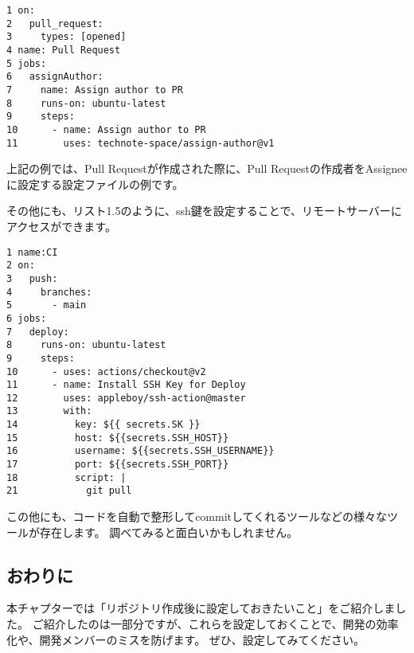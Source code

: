 \begin{tcolorbox}[title=リスト1.4 .github/workflows/pr.yml]
  \begin{verbatim}
1 on:
2   pull_request:
3     types: [opened]
4 name: Pull Request
5 jobs:
6   assignAuthor:
7     name: Assign author to PR
8     runs-on: ubuntu-latest
9     steps:
10      - name: Assign author to PR
11        uses: technote-space/assign-author@v1
\end{verbatim}
\end{tcolorbox}

上記の例では、Pull Requestが作成された際に、Pull Requestの作成者をAssigneeに設定する設定ファイルの例です。

その他にも、リスト1.5のように、ssh鍵を設定することで、リモートサーバーにアクセスができます。
\begin{tcolorbox}[title=リスト1.5 .github/workflows/deploy.yml]
  \begin{verbatim}
1 name:CI
2 on:
3   push:
4     branches:
5       - main
6 jobs:
7   deploy:
8     runs-on: ubuntu-latest
9     steps:
10      - uses: actions/checkout@v2
11      - name: Install SSH Key for Deploy
12        uses: appleboy/ssh-action@master
13        with:
14          key: ${{ secrets.SK }}
15          host: ${{secrets.SSH_HOST}}
16          username: ${{secrets.SSH_USERNAME}}
17          port: ${{secrets.SSH_PORT}}
18          script: |
21            git pull
\end{verbatim}
\end{tcolorbox}

この他にも、コードを自動で整形してcommitしてくれるツールなどの様々なツールが存在します。
調べてみると面白いかもしれません。

\subsection{おわりに}
本チャプターでは「リポジトリ作成後に設定しておきたいこと」をご紹介しました。
ご紹介したのは一部分ですが、これらを設定しておくことで、開発の効率化や、開発メンバーのミスを防げます。
ぜひ、設定してみてください。
